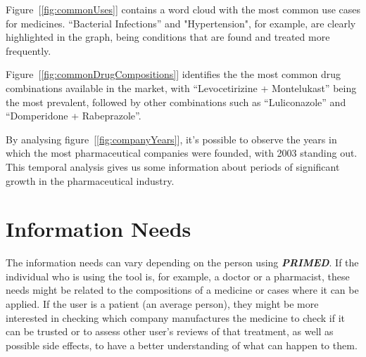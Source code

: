 \documentclass[sigconf]{acmart}
\begin{document}
Figure~[\ref{fig:commonUses}] contains a word cloud with the most common use cases for medicines. “Bacterial Infections” and "Hypertension", for example, are clearly highlighted in the graph, being conditions that are found and treated more frequently.

Figure~[\ref{fig:commonDrugCompositions}] identifies the the most common drug combinations available in the market, with “Levocetirizine + Montelukast” being the most prevalent, followed by other combinations such as “Luliconazole” and “Domperidone + Rabeprazole”.

By analysing figure~[\ref{fig:companyYears}], it's possible to observe the years in which the most pharmaceutical companies were founded, with 2003 standing out. This temporal analysis gives us some information about periods of significant growth in the pharmaceutical industry.

\section{Information Needs}

The information needs can vary depending on the person using \textit{\textbf{PRIMED}}. If the individual who is using the tool is, for example, a doctor or a pharmacist, these needs might be related to the compositions of a medicine or cases where it can be applied. If the user is a patient (an average person), they might be more interested in checking which company manufactures the medicine to check if it can be trusted or to assess other user's reviews of that treatment, as well as possible side effects, to have a better understanding of what can happen to them.
\end{document}

